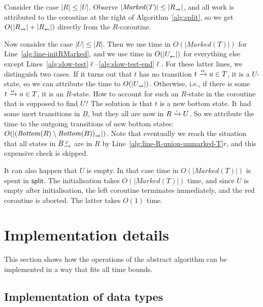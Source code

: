 \documentclass[a4paper,10pt]{article}
\theoremstyle{definition}
\theoremstyle{plain}
\newcommand{\bigo}[1]{{O\!\left(#1\right)}}
\newcommand{\pijl}[1]{\mathrel{\text{$\xrightarrow{\smash[t]{#1}}$}}}
\newcommand{\lijp}[1]{\mathrel{\text{$\xleftarrow{\smash[t]{#1}}$}}}
\newcommand{\size}[1]{\left\lvert #1 \right\rvert}
\newcommand{\BT}{B_{\pijl{T}}}
\newcommand{\Bottom}{\mathit{Bottom}}
\newcommand{\Marked}{\mathit{Marked}}
\begin{document}
Consider the case $\size{R} \leq \size{U}$.
Observe $\size{\Marked(T)} \leq \size{R_{\pijl{}}}$, and all work is attributed to the coroutine at the right of Algorithm~\ref{alg:split},
so we get $\bigo{\size{R_{\pijl{}}} + \size{R_{\lijp{}}}}$ directly from the $R$-coroutine.

Now consider the case $\size{U} \leq \size{R}$.
Then we use time in $\bigo{\size{\Marked(T)}}$ for Line~\ref{alg:line-initRMarked},
and we use time in $\bigo{\size{U_{\lijp{}}}}$ for everything else except Lines~\ref{alg:slow-test}$\ell$--\ref{alg:slow-test-end}$\ell$.
For these latter lines,
we distinguish two cases.
If it turns out that $t$ has no transition $t \pijl{\alpha} u \in T$,
it is a $U$-state, so we can attribute the time to $\bigo{\size{U_{\pijl{}}}}$.
Otherwise, i.e., if there is some $t \pijl{\alpha} u \in T$,
it is an $R$-state.
How to account for such an $R$-state in the coroutine that is supposed to find $U$?
The solution is that $t$ is a new bottom state.
It had some inert transitions in $B$,
but they all are now in $R \pijl{\tau} U$.
So we attribute the time to the outgoing transitions of new bottom states:
$\bigo{\size{(\Bottom(R) \setminus \Bottom(B))_{\pijl{}}}}$.
Note that eventually we reach the situation that all states in $\BT$ are in $R$ by Line~\ref{alg:line-R-union-unmarked-T}$r$,
and this expensive check is skipped.

It can also happen that $U$ is empty. In that case time in $\bigo{\size{\Marked(T)}}$ is spent in $\mathsf{split}$. The initialisation takes $\bigo{\size{\Marked(T)}}$ time, and since $U$ is empty after initialisation, the left coroutine terminates immediately, and the red coroutine is aborted. The latter takes $\bigo{1}$ time.


\section{Implementation details}
\label{sect:implementation}

This section shows how the operations of the abstract algorithm can be implemented
in a way that fits all time bounds.

\subsection{Implementation of data types}
\end{document}

